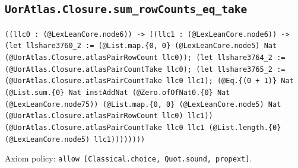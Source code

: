 \documentclass[11pt]{article}
\begin{document}
\subsection*{\texttt{UorAtlas.Closure.sum\_rowCounts\_eq\_take}}
\noindent\texttt{((llc0 : (@LexLeanCore.node6)) -> ((llc1 : (@LexLeanCore.node6)) -> (let llshare3760\_2 := (@List.map.\{0, 0\} (@LexLeanCore.node5) Nat (@UorAtlas.Closure.atlasPairRowCount llc0)); (let llshare3764\_2 := (@UorAtlas.Closure.atlasPairCountTake llc0); (let llshare3765\_2 := (@UorAtlas.Closure.atlasPairCountTake llc0 llc1); (@Eq.\{(0 + 1)\} Nat (@List.sum.\{0\} Nat instAddNat (@Zero.ofOfNat0.\{0\} Nat (@LexLeanCore.node75)) (@List.map.\{0, 0\} (@LexLeanCore.node5) Nat (@UorAtlas.Closure.atlasPairRowCount llc0) llc1)) (@UorAtlas.Closure.atlasPairCountTake llc0 llc1 (@List.length.\{0\} (@LexLeanCore.node5) llc1))))))))}\par
\noindent Axiom policy: \texttt{allow [Classical.choice, Quot.sound, propext]}.\par
\end{document}
